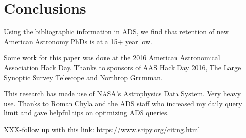 \documentclass[preprint2]{aastex}
\begin{document}
\section{Conclusions}
Using the bibliographic information in ADS, we find that retention of new American Astronomy PhDs is at a 15+ year low.  


\acknowledgments
Some work for this paper was done at the 2016 American Astronomical Association Hack Day. Thanks to sponsors of AAS Hack Day 2016, The Large Synoptic Survey Telescope and Northrop Grumman.

This research has made use of NASA's Astrophysics Data System. Very heavy use. Thanks to Roman Chyla and the ADS staff who increased my daily query limit and gave helpful tips on optimizing ADS queries.

XXX-follow up with this link: https://www.scipy.org/citing.html




\end{document}
